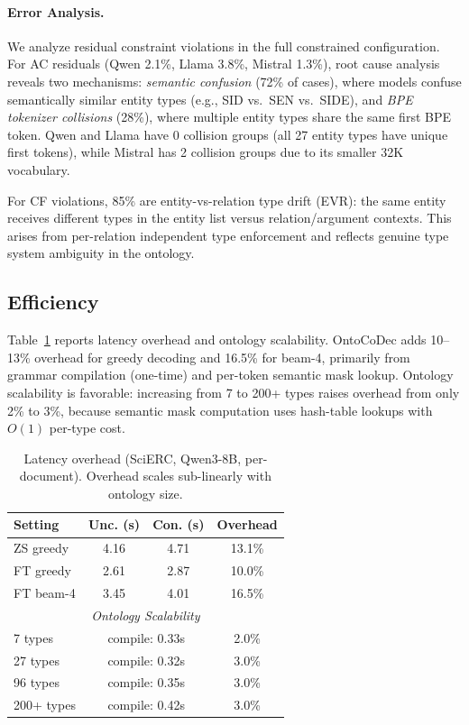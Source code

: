 \documentclass[11pt]{article}
\begin{document}
\paragraph{Error Analysis.}
We analyze residual constraint violations in the full constrained configuration.
For AC residuals (Qwen 2.1\%, Llama 3.8\%, Mistral 1.3\%), root cause analysis reveals two mechanisms: \textit{semantic confusion} (72\% of cases), where models confuse semantically similar entity types (e.g., SID vs.\ SEN vs.\ SIDE), and \textit{BPE tokenizer collisions} (28\%), where multiple entity types share the same first BPE token.
Qwen and Llama have 0 collision groups (all 27 entity types have unique first tokens), while Mistral has 2 collision groups due to its smaller 32K vocabulary.

For CF violations, 85\% are entity-vs-relation type drift (EVR): the same entity receives different types in the entity list versus relation/argument contexts.
This arises from per-relation independent type enforcement and reflects genuine type system ambiguity in the ontology.

\subsection{Efficiency}

Table~\ref{tab:latency} reports latency overhead and ontology scalability.
OntoCoDec adds 10--13\% overhead for greedy decoding and 16.5\% for beam-4, primarily from grammar compilation (one-time) and per-token semantic mask lookup.
Ontology scalability is favorable: increasing from 7 to 200+ types raises overhead from only 2\% to 3\%, because semantic mask computation uses hash-table lookups with $O(1)$ per-type cost.

\begin{table}[t]
\centering
\small
\begin{tabular}{@{}lccc@{}}
\toprule
\textbf{Setting} & \textbf{Unc. (s)} & \textbf{Con. (s)} & \textbf{Overhead} \\
\midrule
ZS greedy & 4.16 & 4.71 & 13.1\% \\
FT greedy & 2.61 & 2.87 & 10.0\% \\
FT beam-4 & 3.45 & 4.01 & 16.5\% \\
\midrule
\multicolumn{4}{c}{\textit{Ontology Scalability}} \\
\midrule
7 types & \multicolumn{2}{c}{compile: 0.33s} & 2.0\% \\
27 types & \multicolumn{2}{c}{compile: 0.32s} & 3.0\% \\
96 types & \multicolumn{2}{c}{compile: 0.35s} & 3.0\% \\
200+ types & \multicolumn{2}{c}{compile: 0.42s} & 3.0\% \\
\bottomrule
\end{tabular}
\caption{Latency overhead (SciERC, Qwen3-8B, per-document). Overhead scales sub-linearly with ontology size.}
\label{tab:latency}
\end{table}
\end{document}
